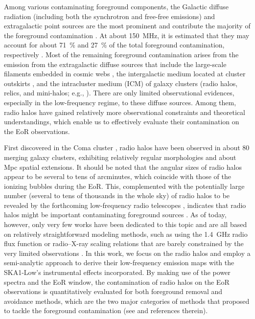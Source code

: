 \documentclass[modern]{aastex62}
\newcommand{\editone}[1]{{\leavevmode\color{cyan}#1}}
\begin{document}
Among various contaminating foreground components, the Galactic diffuse
radiation (including both the synchrotron and free-free emissions)
and extragalactic point sources are the most prominent and contribute
the majority of the foreground contamination \citep[e.g.,][]{%
  shaver1999,diMatteo2004,gleser2008,liu2012,murray2017,spinelli2018}.
At about \SI{150}{\MHz}, it is estimated that they may account for
about \SI{71}{\percent} and \SI{27}{\percent} of the total foreground
contamination, respectively \citep{shaver1999}.
Most of the remaining foreground contamination arises from the emission
from the extragalactic diffuse sources that include the large-scale
filaments embedded in cosmic webs \citep[e.g.,][]{vazza2015},
the intergalactic medium located at cluster outskirts
\citep[e.g.,][]{keshet2004rev},
and the intracluster medium (ICM) of galaxy clusters (radio halos,
relics, and mini-halos; e.g., \citealt{feretti2012rev}).
There are only limited observational evidences, especially in the
low-frequency regime, to these diffuse sources.
Among them, radio halos have gained relatively more observational
constraints and theoretical understandings, which enable us to
effectively evaluate their contamination on the EoR observations.

First discovered in the Coma cluster \citep{large1959}, radio halos
have been observed in about 80 merging galaxy clusters, exhibiting
relatively regular morphologies and about \si{Mpc} spatial extensions.
It should be noted that the angular sizes of radio halos appear to be
several to tens of arcminutes, which coincide with those of the
ionizing bubbles during the EoR.
This, complemented with the potentially large number (several to tens of
thousands in the whole sky) of radio halos to be revealed by the
forthcoming low-frequency radio telescopes \citep[e.g.,][]{cassano2015},
indicates that radio halos might be important contaminating foreground
sources \citep[e.g.,][]{diMatteo2004,gleser2008}.
As of today, however, only very few works have been dedicated to this
topic and are all based on relatively straightforward modeling methods,
such as using the \SI{1.4}{\GHz} radio flux function or radio--X-ray
scaling relations that are barely constrained by the very limited
observations \citep[e.g.,][]{gleser2008,jelic2008}.
In this work, we focus on the radio halos and employ a
\editone{semi-analytic approach}
to derive their low-frequency emission maps with the SKA1-Low's
instrumental effects incorporated.
By making use of the power spectra and the EoR window, the contamination
of radio halos on the EoR observations is quantitatively evaluated for
both foreground removal and avoidance methods, which are the two major
categories of methods that proposed to tackle the foreground
contamination (see \citealt{chapman2016} and references therein).
\end{document}
